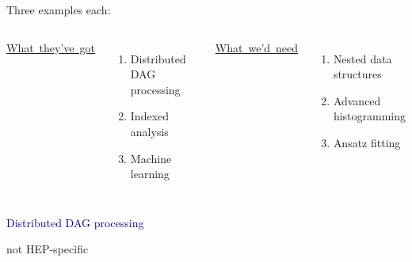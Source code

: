 \documentclass[aspectratio=169]{beamer}
\begin{document}
\begin{frame}{Three examples each:}
\Large
\vspace{-0.5 cm}
\begin{columns}[t]
\mbox{\hspace{0.25 cm}\underline{What they've got}}

\vspace{0.25 cm}
\begin{enumerate}
\item Distributed DAG processing
\item Indexed analysis
\item Machine learning
\end{enumerate}

\mbox{\hspace{0.45 cm}\underline{What we'd need}}

\vspace{0.25 cm}
\begin{enumerate}
\item Nested data structures
\item Advanced histogramming
\item Ansatz fitting
\end{enumerate}

\end{columns}
\end{frame}

\begin{frame}{}
\huge
\vspace{0.5 cm}
\begin{center}
\textcolor{darkblue}{Distributed DAG processing}

\large
\vspace{0.5 cm}
not HEP-specific
\end{center}
\end{frame}
\end{document}
